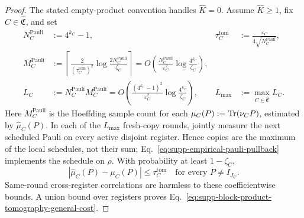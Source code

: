 \documentclass[
  aps,
  prx,
  reprint,
  superscriptaddress,
  amsmath,
  amssymb,
  nofootinbib,
  longbibliography
]{revtex4-2}
\begin{document}
\begin{proof}
The stated empty-product convention handles $\widehat K=0$.  Assume
$\widehat K\ge1$, fix $C\in\widehat{\mathfrak C}$, and set
\begin{align}
N_C^{\mathrm{Pauli}}&:=4^{k_C}-1,
&
\tau_C^{\mathrm{tom}}
&:=\frac{\varepsilon_C}{4\sqrt{N_C^{\mathrm{Pauli}}}},
\nonumber\\
M_C^{\mathrm{Pauli}}
&:=
\left\lceil
\frac{2}{(\tau_C^{\mathrm{tom}})^2}
\log\frac{2N_C^{\mathrm{Pauli}}}{\zeta_C}
\right\rceil
=
O\!\left(
\frac{N_C^{\mathrm{Pauli}}}{\varepsilon_C^2}
\log\frac{4^{k_C}}{\zeta_C}
\right),
\nonumber\\
L_C
&:=
N_C^{\mathrm{Pauli}}M_C^{\mathrm{Pauli}}
=
O\!\left(
\frac{(4^{k_C}-1)^2}{\varepsilon_C^2}
\log\frac{4^{k_C}}{\zeta_C}
\right),
&
L_{\max}
&:=
\max_{C\in\widehat{\mathfrak C}}L_C.
\end{align}
Here $M_C^{\mathrm{Pauli}}$ is the Hoeffding sample count for each
$\mu_C(P):=\Tr(\nu_CP)$, estimated by $\widehat\mu_C(P)$.  In each
of the $L_{\max}$ fresh-copy rounds, jointly measure the next scheduled Pauli
on every active disjoint register.  Hence copies are the maximum of the local
schedules, not their sum; Eq.~\eqref{eq:supp-empirical-pauli-pullback}
implements the schedule on $\rho$.  With probability at least $1-\zeta_C$,
\begin{equation}
|\widehat\mu_C(P)-\mu_C(P)|
\le\tau_C^{\mathrm{tom}}
\quad\text{for every }P\ne I_{J_C}.
\end{equation}
Same-round cross-register correlations are harmless to these coefficientwise
bounds.  A union bound over registers proves
Eq.~\eqref{eq:supp-block-product-tomography-general-cost}.


\end{proof}
\end{document}
